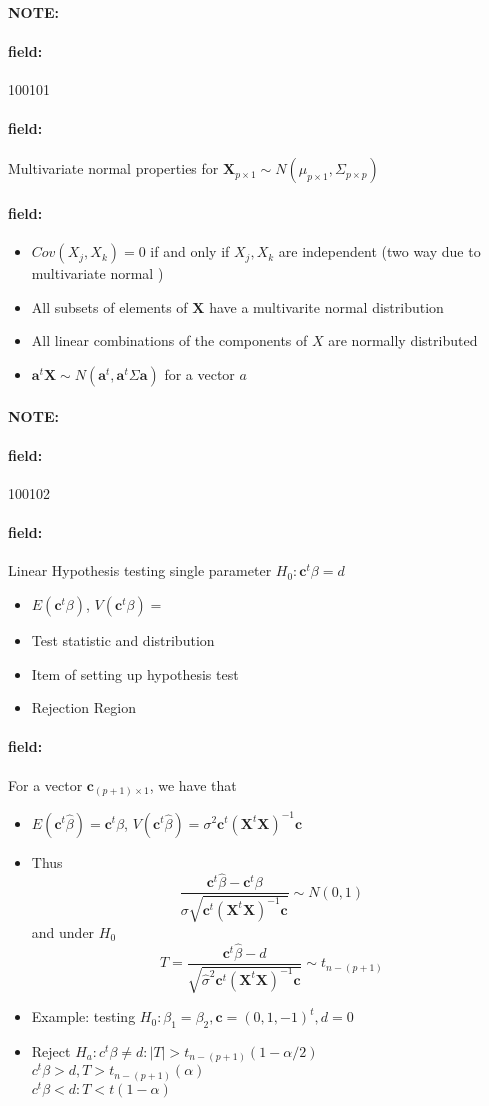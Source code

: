 \documentclass[12pt]{article}
\newenvironment{note}{\paragraph{NOTE:}}{}
\newenvironment{field}{\paragraph{field:}}{}
\begin{document}
\begin{note} \begin{field} \tiny 100101 \end{field}
 \begin{field}
  Multivariate normal properties for $\mathbf{X}_{p \times 1} \sim N(\mu_{p\times 1}, \Sigma_{p \times p})$
 \end{field}
 \begin{field}
  \begin{itemize}
   \item $Cov(X_j,X_k) = 0$ if and only if $X_j,X_k$ are independent (two way due to multivariate normal )
   \item All subsets of elements of $\mathbf{X}$ have a multivarite normal distribution
   \item All linear combinations of the components of $X$ are normally distributed
   \item $\mathbf{a}^t \mathbf{X} \sim N(\mathbf{a}^t, \mathbf{a}^t \Sigma \mathbf{a})$ for a vector $a$
  \end{itemize}
 \end{field}
\end{note}


\begin{note} \begin{field} \tiny 100102 \end{field}
 \begin{field}
  Linear Hypothesis testing single parameter $H_0: \mathbf{c}^t \beta = d$
  \begin{itemize}
   \item $E(\mathbf{c}^t \beta)$, $V(\mathbf{c}^t \beta)= $
   \item Test statistic and distribution
   \item Item of setting up hypothesis test
   \item Rejection Region
  \end{itemize}
 \end{field}
 \begin{field}
  For a vector $\mathbf{c}_{(p+1)\times 1}$, we have that
  \begin{itemize}
   \item $E(\textbf{c}^t\hat{\beta}) = \mathbf{c}^t \beta$, $V(\mathbf{c}^t \hat{\beta}) = \sigma^2 \mathbf{c}^t (\mathbf{X}^t \mathbf{X})^{-1} \mathbf{c}$
   \item Thus $$ \frac{\mathbf{c}^t \hat{\beta} - \mathbf{c}^t \beta }{\sigma \sqrt{\mathbf{c}^t(\mathbf{X}^t \mathbf{X})^{-1} \mathbf{c}}} \sim N(0,1)$$ and under $H_0$
         $$ T = \frac{\mathbf{c}^t \hat{\beta} - d}{ \sqrt{\hat{\sigma}^2\mathbf{c}^t(\mathbf{X}^t \mathbf{X})^{-1} \mathbf{c}}} \sim t_{n - (p+1)}$$
   \item Example: testing $H_0: \beta_1 = \beta_2, \mathbf{c} = (0,1,-1)^t, d = 0$
   \item Reject $H_a: c^t \beta \neq d:  |T| > t_{n - (p+1)}(1-\alpha/2)$\\ $c^t \beta > d, T > t_{n-(p+1)}(\alpha)$\\ $c^t\beta < d: T < t(1 - \alpha)$
  \end{itemize}
 \end{field}
\end{note}
\end{document}
